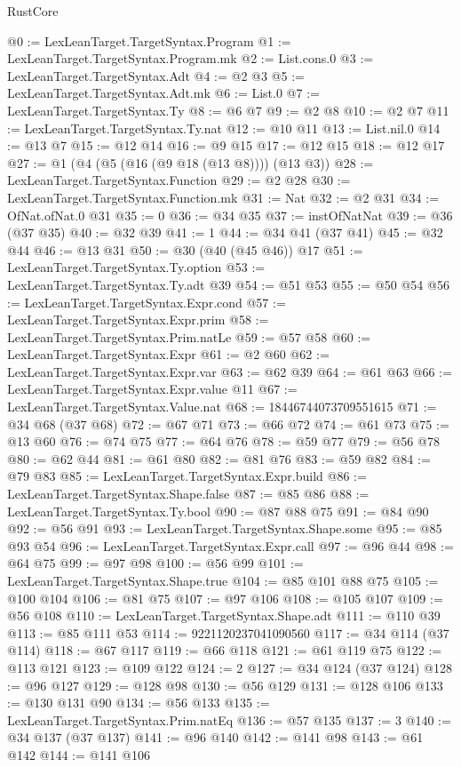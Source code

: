 \begin{lexlean}{RustCore}
\begin{coremodule}
@0 := LexLeanTarget.TargetSyntax.Program
@1 := LexLeanTarget.TargetSyntax.Program.mk
@2 := List.cons.{0}
@3 := LexLeanTarget.TargetSyntax.Adt
@4 := @2 @3
@5 := LexLeanTarget.TargetSyntax.Adt.mk
@6 := List.{0}
@7 := LexLeanTarget.TargetSyntax.Ty
@8 := @6 @7
@9 := @2 @8
@10 := @2 @7
@11 := LexLeanTarget.TargetSyntax.Ty.nat
@12 := @10 @11
@13 := List.nil.{0}
@14 := @13 @7
@15 := @12 @14
@16 := @9 @15
@17 := @12 @15
@18 := @12 @17
@27 := @1 (@4 (@5 (@16 (@9 @18 (@13 @8)))) (@13 @3))
@28 := LexLeanTarget.TargetSyntax.Function
@29 := @2 @28
@30 := LexLeanTarget.TargetSyntax.Function.mk
@31 := Nat
@32 := @2 @31
@34 := OfNat.ofNat.{0} @31
@35 := 0
@36 := @34 @35
@37 := instOfNatNat
@39 := @36 (@37 @35)
@40 := @32 @39
@41 := 1
@44 := @34 @41 (@37 @41)
@45 := @32 @44
@46 := @13 @31
@50 := @30 (@40 (@45 @46)) @17
@51 := LexLeanTarget.TargetSyntax.Ty.option
@53 := LexLeanTarget.TargetSyntax.Ty.adt @39
@54 := @51 @53
@55 := @50 @54
@56 := LexLeanTarget.TargetSyntax.Expr.cond
@57 := LexLeanTarget.TargetSyntax.Expr.prim
@58 := LexLeanTarget.TargetSyntax.Prim.natLe
@59 := @57 @58
@60 := LexLeanTarget.TargetSyntax.Expr
@61 := @2 @60
@62 := LexLeanTarget.TargetSyntax.Expr.var
@63 := @62 @39
@64 := @61 @63
@66 := LexLeanTarget.TargetSyntax.Expr.value @11
@67 := LexLeanTarget.TargetSyntax.Value.nat
@68 := 18446744073709551615
@71 := @34 @68 (@37 @68)
@72 := @67 @71
@73 := @66 @72
@74 := @61 @73
@75 := @13 @60
@76 := @74 @75
@77 := @64 @76
@78 := @59 @77
@79 := @56 @78
@80 := @62 @44
@81 := @61 @80
@82 := @81 @76
@83 := @59 @82
@84 := @79 @83
@85 := LexLeanTarget.TargetSyntax.Expr.build
@86 := LexLeanTarget.TargetSyntax.Shape.false
@87 := @85 @86
@88 := LexLeanTarget.TargetSyntax.Ty.bool
@90 := @87 @88 @75
@91 := @84 @90
@92 := @56 @91
@93 := LexLeanTarget.TargetSyntax.Shape.some
@95 := @85 @93 @54
@96 := LexLeanTarget.TargetSyntax.Expr.call
@97 := @96 @44
@98 := @64 @75
@99 := @97 @98
@100 := @56 @99
@101 := LexLeanTarget.TargetSyntax.Shape.true
@104 := @85 @101 @88 @75
@105 := @100 @104
@106 := @81 @75
@107 := @97 @106
@108 := @105 @107
@109 := @56 @108
@110 := LexLeanTarget.TargetSyntax.Shape.adt
@111 := @110 @39
@113 := @85 @111 @53
@114 := 9221120237041090560
@117 := @34 @114 (@37 @114)
@118 := @67 @117
@119 := @66 @118
@121 := @61 @119 @75
@122 := @113 @121
@123 := @109 @122
@124 := 2
@127 := @34 @124 (@37 @124)
@128 := @96 @127
@129 := @128 @98
@130 := @56 @129
@131 := @128 @106
@133 := @130 @131 @90
@134 := @56 @133
@135 := LexLeanTarget.TargetSyntax.Prim.natEq
@136 := @57 @135
@137 := 3
@140 := @34 @137 (@37 @137)
@141 := @96 @140
@142 := @141 @98
@143 := @61 @142
@144 := @141 @106

\end{coremodule}
\end{lexlean}
